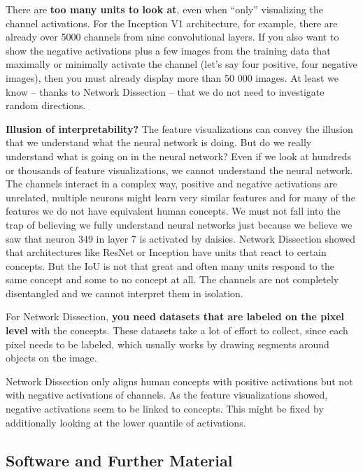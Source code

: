 \documentclass[
  11pt,
]{scrbook}
\begin{document}
There are \textbf{too many units to look at}, even when ``only'' visualizing the channel activations.
For the Inception V1 architecture, for example, there are already over 5000 channels from nine convolutional layers.
If you also want to show the negative activations plus a few images from the training data that maximally or minimally activate the channel (let's say four positive, four negative images), then you must already display more than 50 000 images.
At least we know -- thanks to Network Dissection -- that we do not need to investigate random directions.

\textbf{Illusion of interpretability?}
The feature visualizations can convey the illusion that we understand what the neural network is doing.
But do we really understand what is going on in the neural network?
Even if we look at hundreds or thousands of feature visualizations, we cannot understand the neural network.
The channels interact in a complex way, positive and negative activations are unrelated, multiple neurons might learn very similar features and for many of the features we do not have equivalent human concepts.
We must not fall into the trap of believing we fully understand neural networks just because we believe we saw that neuron 349 in layer 7 is activated by daisies.
Network Dissection showed that architectures like ResNet or Inception have units that react to certain concepts.
But the IoU is not that great and often many units respond to the same concept and some to no concept at all.
The channels are not completely disentangled and we cannot interpret them in isolation.

For Network Dissection, \textbf{you need datasets that are labeled on the pixel level} with the concepts.
These datasets take a lot of effort to collect, since each pixel needs to be labeled, which usually works by drawing segments around objects on the image.

Network Dissection only aligns human concepts with positive activations but not with negative activations of channels.
As the feature visualizations showed, negative activations seem to be linked to concepts.
This might be fixed by additionally looking at the lower quantile of activations.

\hypertarget{software-and-further-material}{%
\subsection{Software and Further Material}\label{software-and-further-material}}
\end{document}
